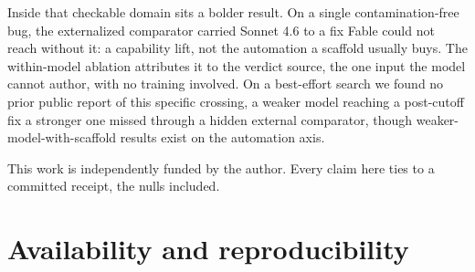 \documentclass[
  10pt,
]{article}
\begin{document}
Inside that checkable domain sits a bolder result. On a single
contamination-free bug, the externalized comparator carried Sonnet 4.6
to a fix Fable could not reach without it: a capability lift, not the
automation a scaffold usually buys. The within-model ablation attributes
it to the verdict source, the one input the model cannot author, with no
training involved. On a best-effort search we found no prior public
report of this specific crossing, a weaker model reaching a post-cutoff
fix a stronger one missed through a hidden external comparator, though
weaker-model-with-scaffold results exist on the automation axis.

This work is independently funded by the author. Every claim here ties
to a committed receipt, the nulls included.

\section{Availability and reproducibility}\label{availability}
\end{document}
